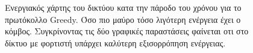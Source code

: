 \begin{figure}[H]
  \centering
  \caption{Ενεργιακός χάρτης του δικτύου κατα την πάροδο του χρόνου για το πρωτόκολλο Greedy. Όσο πιο μαύρο τόσο λιγότερη ενέργεια έχει ο κόμβος. Συγκρίνοντας τις δύο
γραφικές παραστάσεις φαίνεται οτι στο δίκτυο με φορτιστή υπάρχει καλύτερη εξισορρόπηση ενέργειας.}
  \label{fig:5_1exp_4_1}
\end{figure}

